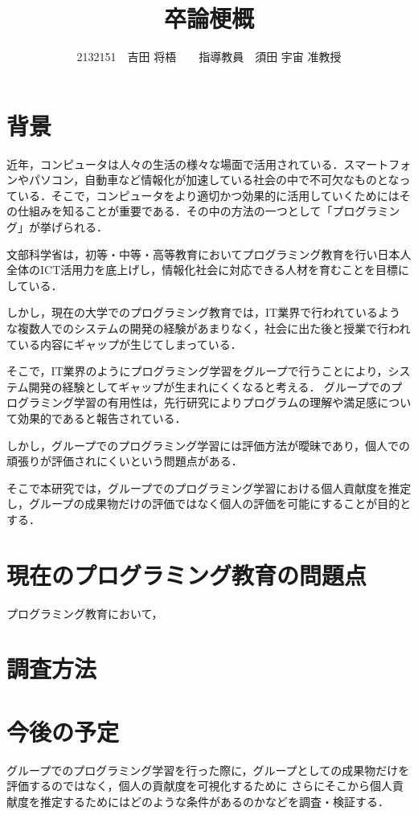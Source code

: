 \documentclass[twocolumn,10pt,a4j]{ltjsarticle}
\title{卒論梗概}
\author{2132151　吉田 将梧　　指導教員　須田 宇宙 准教授}
\date{}
\begin{document}
\maketitle

\section{背景}
近年，コンピュータは人々の生活の様々な場面で活用されている．スマートフォンやパソコン，自動車など情報化が加速している社会の中で不可欠なものとなっている．そこで，コンピュータをより適切かつ効果的に活用していくためにはその仕組みを知ることが重要である．その中の方法の一つとして「プログラミング」が挙げられる．

文部科学省は，初等・中等・高等教育においてプログラミング教育を行い日本人全体のICT活用力を底上げし，情報化社会に対応できる人材を育むことを目標にしている．

しかし，現在の大学でのプログラミング教育では，IT業界で行われているような複数人でのシステムの開発の経験があまりなく，社会に出た後と授業で行われている内容にギャップが生じてしまっている．

そこで，IT業界のようにプログラミング学習をグループで行うことにより，システム開発の経験としてギャップが生まれにくくなると考える．
グループでのプログラミング学習の有用性は，先行研究によりプログラムの理解や満足感について効果的であると報告されている．

しかし，グループでのプログラミング学習には評価方法が曖昧であり，個人での頑張りが評価されにくいという問題点がある．

そこで本研究では，グループでのプログラミング学習における個人貢献度を推定し，グループの成果物だけの評価ではなく個人の評価を可能にすることが目的とする．

\section{現在のプログラミング教育の問題点}
プログラミング教育において，

\section{調査方法}





\section{今後の予定}
グループでのプログラミング学習を行った際に，グループとしての成果物だけを評価するのではなく，個人の貢献度を可視化するために
さらにそこから個人貢献度を推定するためにはどのような条件があるのかなどを調査・検証する．
\end{document}
